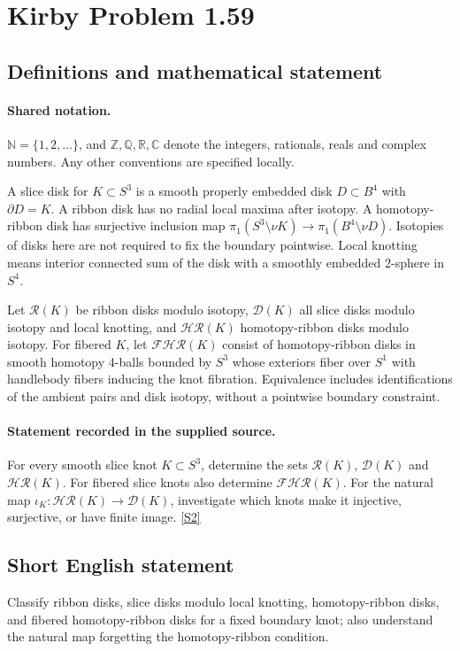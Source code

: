 \documentclass[11pt]{article}
\newcommand{\sref}[2]{\hyperlink{source:#1:#2}{[S#2]}}
\begin{document}
\section{Kirby Problem 1.59}\label{statement}

\subsection{Definitions and mathematical statement}

\paragraph{Shared notation.}$\mathbb N=\{1,2,\ldots\}$, and $\mathbb Z,\mathbb Q,\mathbb R,\mathbb C$ denote the integers, rationals, reals and complex numbers. Any other conventions are specified locally.


A slice disk for $K\subset S^3$ is a smooth properly embedded disk $D\subset B^4$ with $\partial D=K$. A ribbon disk has no radial local maxima after isotopy. A homotopy-ribbon disk has surjective inclusion map $\pi_1(S^3\setminus\nu K)\to\pi_1(B^4\setminus\nu D)$. Isotopies of disks here are not required to fix the boundary pointwise. Local knotting means interior connected sum of the disk with a smoothly embedded 2-sphere in $S^4$.

Let $\mathcal R(K)$ be ribbon disks modulo isotopy, $\mathcal D(K)$ all slice disks modulo isotopy and local knotting, and $\mathcal{HR}(K)$ homotopy-ribbon disks modulo isotopy. For fibered $K$, let $\mathcal{FHR}(K)$ consist of homotopy-ribbon disks in smooth homotopy 4-balls bounded by $S^3$ whose exteriors fiber over $S^1$ with handlebody fibers inducing the knot fibration. Equivalence includes identifications of the ambient pairs and disk isotopy, without a pointwise boundary constraint.
\paragraph{Statement recorded in the supplied source.}
For every smooth slice knot $K\subset S^3$, determine the sets $\mathcal R(K)$, $\mathcal D(K)$ and $\mathcal{HR}(K)$. For fibered slice knots also determine $\mathcal{FHR}(K)$. For the natural map $\iota_K:\mathcal{HR}(K)\to\mathcal D(K)$, investigate which knots make it injective, surjective, or have finite image. \sref{statement}{2}

\subsection{Short English statement}
Classify ribbon disks, slice disks modulo local knotting, homotopy-ribbon disks, and fibered homotopy-ribbon disks for a fixed boundary knot; also understand the natural map forgetting the homotopy-ribbon condition.
\end{document}
